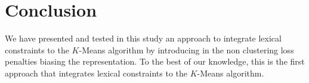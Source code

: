 \section{Conclusion}
We have presented and tested in this study an approach to integrate lexical 
constraints to the $K$-Means algorithm by introducing in the non clustering 
loss penalties biasing the representation. To  the best of our knowledge, this 
is the first approach that integrates lexical constraints to the $K$-Means 
algorithm.
